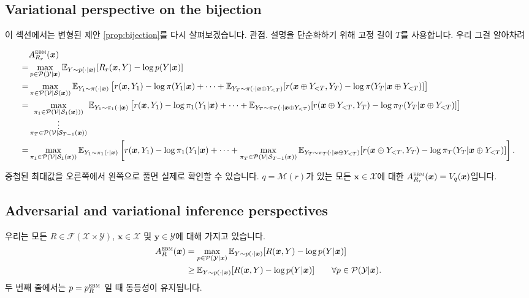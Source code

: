 \documentclass{article}
\def\x{{\bm{x}}}
\def\y{{\bm{y}}}
\def\EE{{\mathbb{E}}}
\def\cF{{\mathcal{F}}}
\def\cM{{\mathcal{M}}}
\def\cP{{\mathcal{P}}}
\def\cS{{\mathcal{S}}}
\def\cV{{\mathcal{V}}}
\def\cX{{\mathcal{X}}}
\def\cY{{\mathcal{Y}}}
\newcommand{\Rsub}[1]{R_{#1}}
\def\ebm{{\textsc{ebm}}}
\begin{document}
\subsection{Variational perspective on the bijection} 
 \label{sec:bijection_variational_perspective}

이 섹션에서는 변형된 제안 \ref{prop:bijection}를 다시 살펴보겠습니다.
관점.  설명을 단순화하기 위해 고정 길이 $T$를 사용합니다. 우리
그걸 알아차려
 \begin{small} 
 \begin{align} 
&A^ \ebm _{ \Rsub{r} }( \x ) \\
=& \max _{p \in \cP ( \cY | \x )} \EE _{Y \sim p( \cdot | \x )}[ \Rsub{r} ( \x , Y) - \log p(Y| \x )] \\
=& \max _{ \pi \in \cP ( \cV | \cS ( \x ))}
 \EE _{Y_1 \sim \pi ( \cdot | \x )} \left [ r( \x , Y_1) - \log \pi (Y_1| \x )
    + \dots + \EE _{Y_T \sim \pi ( \cdot | \x \oplus Y_{<T})}[r( \x \oplus Y_{<T}, Y_T) - \log \pi (Y_T| \x \oplus Y_{<T})]
 \right ] \\
=& \max _{ \substack { \pi _1 \in \cP ( \cV | \cS _1( \x )))\\ \vdots \\ \pi _T \in \cP ( \cV | \cS _{T-1}( \x ))}}
 \EE _{Y_1 \sim \pi _1( \cdot | \x )} \left [ r( \x , Y_1) - \log \pi _1(Y_1| \x )
    + \dots + \EE _{Y_T \sim \pi _T( \cdot | \x \oplus Y_{<T})}[r( \x \oplus Y_{<T}, Y_T) - \log \pi _T(Y_T| \x \oplus Y_{<T})]
 \right ] \\
=& \max _{ \pi _1 \in \cP ( \cV | \cS _1( \x ))}
 \EE _{Y_1 \sim \pi _1( \cdot | \x )} \left [ r( \x , Y_1) - \log \pi _1(Y_1| \x)
    + \dots + 
 \max _{ \pi _T \in \cP ( \cV | \cS _{T-1}( \x ))} 
 \EE _{Y_T \sim \pi _T( \cdot | \x \oplus Y_{<T})}[r( \x \oplus Y_{<T}, Y_T) - \log \pi _T(Y_T| \x \oplus Y_{<T})]
 \right].
 \end{align} 
 \end{small} 
중첩된 최대값을 오른쪽에서 왼쪽으로 풀면 실제로 확인할 수 있습니다. 
$q = \cM(r)$가 있는 모든 $\x \in \cX$에 대한 $A^\ebm_{\Rsub{r}}(\x) = V_q(\x)$입니다.

\subsection{Adversarial and variational inference perspectives} 
 \label{sec:bijection_adversarial_perspective}

우리는 모든 $R \in \cF(\cX \times \cY)$, $\x \in \cX$ 및 $\y \in \cY$에 대해 가지고 있습니다.
 \begin{align} 
A^ \ebm _{R}( \x )
&= \max _{p \in \cP ( \cY | \x )} \EE _{Y \sim p( \cdot | \x )}[R( \x , Y) - \log p(Y| \x )] \\
& \ge \EE _{Y \sim p( \cdot | \x )}[R( \x , Y) - \log p(Y| \x )] \qquad \forall p \in \cP ( \cY | \x ).
 \end{align} 
두 번째 줄에서는 $p = p^\ebm_R$ 일 때 동등성이 유지됩니다.
\end{document}
